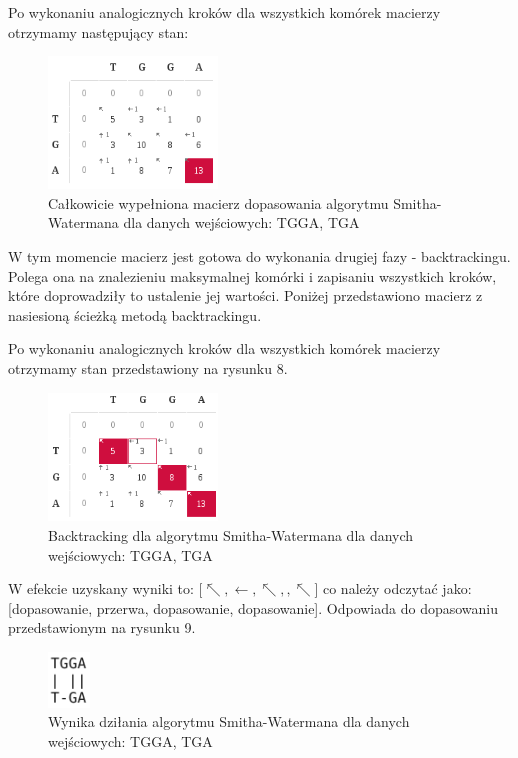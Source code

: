\documentclass[a4paper,12pt]{article}
\begin{document}
Po wykonaniu analogicznych kroków dla wszystkich komórek macierzy otrzymamy następujący stan:
\begin{figure}[H]
  \vspace{5pt}
  \centering
  \begin{center}
  \includegraphics[width=0.4\textwidth]{images/SchematDzialaniaAlgorytmuPelnaMacierz.png}
  \end{center}
  \caption{Całkowicie wypełniona macierz dopasowania algorytmu Smitha-Watermana dla danych wejściowych: TGGA, TGA}
 \end{figure}


W tym momencie macierz jest gotowa do wykonania drugiej fazy - backtrackingu. Polega ona na znalezieniu maksymalnej komórki i zapisaniu wszystkich kroków, które doprowadziły to ustalenie jej wartości. Poniżej przedstawiono macierz z nasiesioną ścieżką metodą backtrackingu. 

Po wykonaniu analogicznych kroków dla wszystkich komórek macierzy otrzymamy stan przedstawiony na rysunku 8.
\begin{figure}[H]
  \vspace{5pt}
  \centering
  \begin{center}
  \includegraphics[width=0.4\textwidth]{images/SchematDzialaniaAlgorytmuPelnaMacierzBacktracking.png}
  \end{center}
  \caption{Backtracking dla algorytmu Smitha-Watermana dla danych wejściowych: TGGA, TGA}
 \end{figure}

W efekcie uzyskany wyniki to: [$\nwarrow, \leftarrow, \nwarrow, , \nwarrow$] co należy odczytać jako: [dopasowanie, przerwa, dopasowanie, dopasowanie]. 
Odpowiada do dopasowaniu przedstawionym na rysunku 9. 
\begin{figure}[H]
  \vspace{5pt}
  \centering
  \begin{center}
  \includegraphics[width=0.1\textwidth]{images/uzyskaneDopasowanie.png}
  \end{center}
  \caption{Wynika dziłania algorytmu Smitha-Watermana dla danych wejściowych: TGGA, TGA}
 \end{figure}
\end{document}
